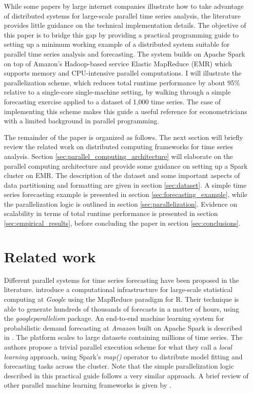 \documentclass[11pt]{article}
\renewcommand{\cite}{\citet}
\begin{document}
While some papers by large internet companies illustrate how to take advantage of distributed systems for large-scale parallel time series analysis, the literature provides little guidance on the technical implementation details. The objective of this paper is to bridge this gap by providing a practical programming guide to setting up a minimum working example of a distributed system suitable for parallel time series analysis and forecasting. The system builds on Apache Spark on top of Amazon's Hadoop-based service Elastic MapReduce (EMR) which supports memory and CPU-intensive parallel computations. I will illustrate the parallelization scheme, which reduces total runtime performance by about 95\% relative to a single-core single-machine setting, by walking through a simple forecasting exercise applied to a dataset of 1,000 time series. The ease of implementing this scheme makes this guide a useful reference for econometricians with a limited background in parallel programming. 

The remainder of the paper is organized as follows. The next section will briefly review the related work on distributed computing frameworks for time series analysis. Section \ref{sec:parallel_computing_architecture} will elaborate on the parallel computing architecture and provide some guidance on setting up a Spark cluster on EMR. The description of the dataset and some important aspects of data partitioning and formatting are given in section \ref{sec:dataset}. A simple time series forecasting example is presented in section \ref{sec:forecasting_example}, while the parallelization logic is outlined in section \ref{sec:parallelization}. Evidence on scalability in terms of total runtime performance is presented in section \ref{sec:empirical_results}, before concluding the paper in section \ref{sec:conclusions}.   

\section{Related work}
\label{sec:related_work}

Different parallel systems for time series forecasting have been proposed in the literature. \cite{Stokely2011LargeScalePS} introduce a computational infrastructure for large-scale statistical
computing at \emph{Google} using the MapReduce paradigm for R. Their technique is able to generate hundreds of thousands of forecasts in a matter of hours, using the \emph{googleparallelism} package. An end-to-end machine learning system for probabilistic demand forecasting at \emph{Amazon} built on Apache Spark is described in \cite{Boese2017}. The platform scales to large datasets containing millions of time series. The authors propose a trivial parallel execution scheme for what they call a \emph{local learning} approach, using Spark's \emph{map()} operator to distribute model fitting and forecasting tasks across the cluster. Note that the simple parallelization logic described in this practical guide follows a very similar approach. A brief review of other parallel machine learning frameworks is given by \cite{chun2015dolphin}.
\end{document}
